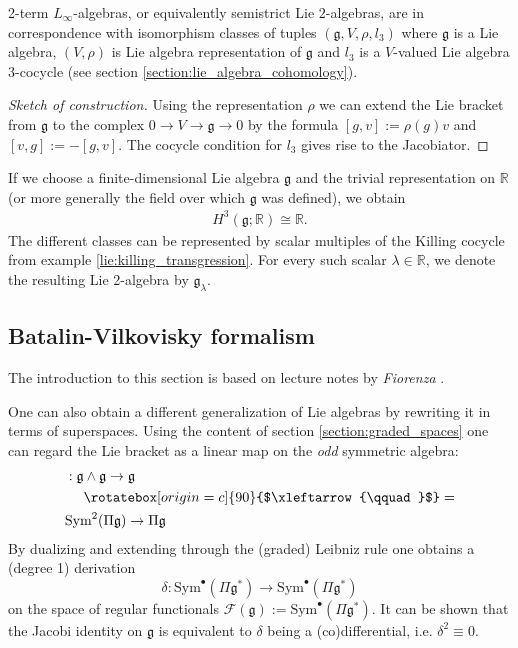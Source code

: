     \begin{property}
        2-term $L_\infty$-algebras, or equivalently semistrict Lie $2$-algebras, are in correspondence with isomorphism classes of tuples $(\mathfrak{g},V,\rho,l_3)$ where $\mathfrak{g}$ is a Lie algebra, $(V,\rho)$ is Lie algebra representation of $\mathfrak{g}$ and $l_3$ is a $V$-valued Lie algebra 3-cocycle (see section \ref{section:lie_algebra_cohomology}).

        \begin{proof}[Sketch of construction]
            Using the representation $\rho$ we can extend the Lie bracket from $\mathfrak{g}$ to the complex $0\rightarrow V\rightarrow\mathfrak{g}\rightarrow0$ by the formula $[g,v]:=\rho(g)v$ and $[v,g] := -[g,v]$. The cocycle condition for $l_3$ gives rise to the Jacobiator.
        \end{proof}
    \end{property}
    \begin{example}\label{hda:gk_lie_2_algebra}
        If we choose a finite-dimensional Lie algebra $\mathfrak{g}$ and the trivial representation on $\mathbb{R}$ (or more generally the field over which $\mathfrak{g}$ was defined), we obtain
        \begin{gather}
            H^3(\mathfrak{g}; \mathbb{R})\cong\mathbb{R}.
        \end{gather}
        The different classes can be represented by scalar multiples of the Killing cocycle from example \ref{lie:killing_transgression}. For every such scalar $\lambda\in\mathbb{R}$, we denote the resulting Lie 2-algebra by $\mathfrak{g}_\lambda$.
    \end{example}

\subsection{Batalin-Vilkovisky formalism}\label{section:bv_formalism}

    The introduction to this section is based on lecture notes by \textit{Fiorenza} \cite{bv_formalism}.

    One can also obtain a different generalization of Lie algebras by rewriting it in terms of superspaces. Using the content of section \ref{section:graded_spaces} one can regard the Lie bracket as a linear map on the \textit{odd} symmetric algebra:
    \begin{align*}
        [\cdot,\cdot]&:\mathfrak{g}\wedge\mathfrak{g}\rightarrow\mathfrak{g}\\
        &\quad\ \rotatebox[origin=c]{90}{$\xleftarrow{\qquad}$}=\\
        &\text{Sym}^2(\Pi\mathfrak{g})\rightarrow\Pi\mathfrak{g}
    \end{align*}
    By dualizing and extending through the (graded) Leibniz rule one obtains a (degree 1) derivation \[\delta:\text{Sym}^\bullet(\Pi\mathfrak{g}^*)\rightarrow\text{Sym}^\bullet(\Pi\mathfrak{g}^*)\] on the space of regular functionals $\mathcal{F}(\mathfrak{g}):=\text{Sym}^\bullet(\Pi\mathfrak{g}^*)$. It can be shown that the Jacobi identity on $\mathfrak{g}$ is equivalent to $\delta$ being a (co)differential, i.e. $\delta^2\equiv0$.


